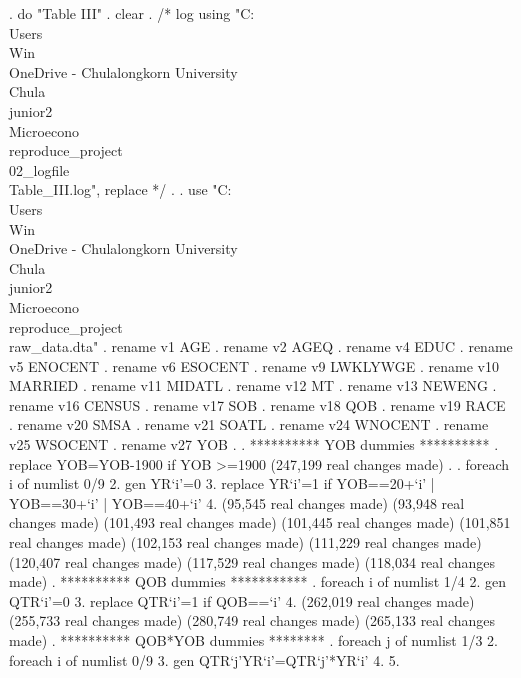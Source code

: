 . do "Table III"
{\smallskip}
. clear
{\smallskip}
. /* log using "C:\\Users\\Win\\OneDrive - Chulalongkorn University\\Chula\\junior2\\Microecono\\reproduce_project\\02_logfile\\Table_III.log", replace  */
. 
. use "C:\\Users\\Win\\OneDrive - Chulalongkorn University\\Chula\\junior2\\Microecono\\reproduce_project\\raw_data.dta"
{\smallskip}
. rename v1 AGE
{\smallskip}
. rename v2 AGEQ
{\smallskip}
. rename v4 EDUC
{\smallskip}
. rename v5 ENOCENT
{\smallskip}
. rename v6 ESOCENT
{\smallskip}
. rename v9 LWKLYWGE
{\smallskip}
. rename v10 MARRIED
{\smallskip}
. rename v11 MIDATL
{\smallskip}
. rename v12 MT
{\smallskip}
. rename v13 NEWENG
{\smallskip}
. rename v16 CENSUS
{\smallskip}
. rename v17 SOB
{\smallskip}
. rename v18 QOB
{\smallskip}
. rename v19 RACE
{\smallskip}
. rename v20 SMSA
{\smallskip}
. rename v21 SOATL
{\smallskip}
. rename v24 WNOCENT
{\smallskip}
. rename v25 WSOCENT
{\smallskip}
. rename v27 YOB
{\smallskip}
. 
. **********  YOB dummies **********
. replace YOB=YOB-1900 if YOB >=1900
(247,199 real changes made)
{\smallskip}
. 
. foreach i of numlist 0/9 {\lbr}
  2. gen YR`i'=0
  3. replace YR`i'=1 if YOB==20+`i' | YOB==30+`i' | YOB==40+`i' 
  4. {\rbr}
(95,545 real changes made)
(93,948 real changes made)
(101,493 real changes made)
(101,445 real changes made)
(101,851 real changes made)
(102,153 real changes made)
(111,229 real changes made)
(120,407 real changes made)
(117,529 real changes made)
(118,034 real changes made)
{\smallskip}
. **********  QOB dummies ***********
. foreach i of numlist 1/4 {\lbr}
  2. gen QTR`i'=0
  3. replace QTR`i'=1 if QOB==`i'
  4. {\rbr}
(262,019 real changes made)
(255,733 real changes made)
(280,749 real changes made)
(265,133 real changes made)
{\smallskip}
. **********  QOB*YOB dummies ********
. foreach j of numlist 1/3 {\lbr}
  2. foreach i of numlist 0/9 {\lbr}
  3. gen QTR`j'YR`i'=QTR`j'*YR`i'
  4. {\rbr}
  5. {\rbr}
{\smallskip}
